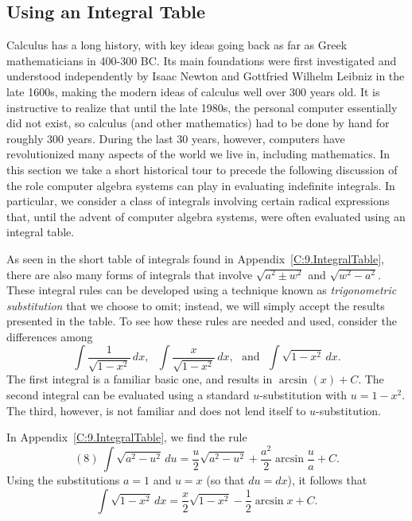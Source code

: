 

\subsection*{Using an Integral Table}

Calculus has a long history, with key ideas going back as far as Greek mathematicians in 400-300 BC.  Its main foundations were first investigated and understood independently by Isaac Newton and Gottfried Wilhelm Leibniz in the late 1600s, making the modern ideas of calculus well over 300 years old.  It is instructive to realize that until the late 1980s, the personal computer essentially did not exist, so calculus (and other mathematics) had to be done by hand for roughly 300 years.  During the last 30 years, however, computers have revolutionized many aspects of the world we live in, including mathematics.  In this section we take a short historical tour to precede the following discussion of the role computer algebra systems can play in evaluating indefinite integrals.  In particular, we consider a class of integrals involving certain radical expressions that, until the advent of computer algebra systems, were often evaluated using an integral table.

As seen in the short table of integrals found in Appendix~\ref{C:9.IntegralTable}, there are also many forms of integrals that involve $\sqrt{a^2 \pm w^2}$ and $\sqrt{w^2 - a^2}.$  These integral rules can be developed using a technique known as \emph{trigonometric substitution} that we choose to omit; instead, we will simply accept the results presented in the table.  To see how these rules are needed and used, consider the differences among
$$\int \frac{1}{\sqrt{1-x^2}} \,dx, \ \ \  \int \frac{x}{\sqrt{1-x^2}} \,dx, \ \ \  \mbox{and} \ \ \ \int \sqrt{1-x^2} \,dx.$$
The first integral is a familiar basic one, and results in $\arcsin(x) + C$.  The second integral can be evaluated using a standard $u$-substitution with $u = 1-x^2$.  The third, however, is not familiar and does not lend itself to $u$-substitution.

In Appendix~\ref{C:9.IntegralTable}, we find the rule
$$(8) ~  \int \sqrt{a^2 - u^2} \, du = \frac{u}{2}\sqrt{a^2 - u^2} + \frac{a^2}{2} \arcsin \frac{u}{a} + C.$$
Using the substitutions $a = 1$ and $u = x$ (so that $du = dx$), it follows that 
$$\int \sqrt{1-x^2} \, dx = \frac{x}{2} \sqrt{1-x^2} - \frac{1}{2} \arcsin x + C.$$

